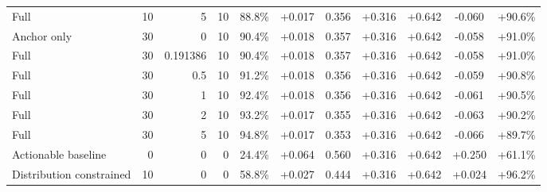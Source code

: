 \begin{table}[htbp]
\begin{tabular}{lrrrccccccc}
Full & 10 & 5 & 10 & 88.8\% & +0.017 & 0.356 & +0.316 & +0.642 & -0.060 & +90.6\% \\
Anchor only & 30 & 0 & 10 & 90.4\% & +0.018 & 0.357 & +0.316 & +0.642 & -0.058 & +91.0\% \\
Full & 30 & 0.191386 & 10 & 90.4\% & +0.018 & 0.357 & +0.316 & +0.642 & -0.058 & +91.0\% \\
Full & 30 & 0.5 & 10 & 91.2\% & +0.018 & 0.356 & +0.316 & +0.642 & -0.059 & +90.8\% \\
Full & 30 & 1 & 10 & 92.4\% & +0.018 & 0.356 & +0.316 & +0.642 & -0.061 & +90.5\% \\
Full & 30 & 2 & 10 & 93.2\% & +0.017 & 0.355 & +0.316 & +0.642 & -0.063 & +90.2\% \\
Full & 30 & 5 & 10 & 94.8\% & +0.017 & 0.353 & +0.316 & +0.642 & -0.066 & +89.7\% \\
Actionable baseline & 0 & 0 & 0 & 24.4\% & +0.064 & 0.560 & +0.316 & +0.642 & +0.250 & +61.1\% \\
Distribution constrained & 10 & 0 & 0 & 58.8\% & +0.027 & 0.444 & +0.316 & +0.642 & +0.024 & +96.2\% \\
\bottomrule
\end{tabular}
\end{table}